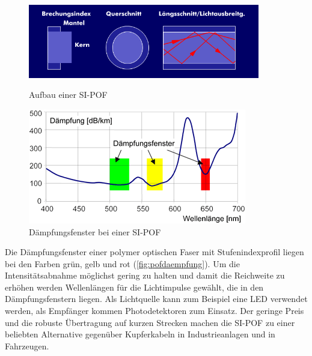 \begin{figure}[h]
    \begin{center}
        \begin{minipage}[t]{0.4\textwidth}
            \begin{center}
                \includegraphics[width=0.9\textwidth]{Bilder/Optische_Wellenleiter_Die_Polymer_Optische_Faser/Brechzahlprofile/pofsi.png}
                \caption[Aufbau einer SI-POF \newline \url{http://www.itwissen.info/bilder/aufbau-und-brechungsprofil-der-stufenindex-profilfaser.png} (zuletzt aufgerufen am 19.09.2015)]{Aufbau einer SI-POF}
                \label{fig:pofsi}
            \end{center}
        \end{minipage}
        \hspace{0.025\textwidth}
        \begin{minipage}[t]{0.4\textwidth}
            \begin{center}
                \includegraphics[height=0.1\textheight]{Bilder/Optische_Wellenleiter_Die_Polymer_Optische_Faser/Funktionsweise/pofdaempfung.png}
                \caption[Dämpfungsfenster bei einer SI-POF \newline \url{http://www.pofac.fh-nuernberg.de/pofac/de/was_sind_pof/images/pmma_daempfung.png} (zuletzt aufgerufen am 19.09.2015)]{Dämpfungsfenster bei einer SI-POF}
                \label{fig:pofdaempfung}
            \end{center}
        \end{minipage}
    \end{center}
\end{figure}

Die Dämpfungsfenster einer polymer optischen Faser mit Stufenindexprofil liegen
bei den Farben grün, gelb und rot (\autoref{fig:pofdaempfung}). Um die
Intensitätsabnahme möglichst gering zu halten und damit die Reichweite zu
erhöhen werden Wellenlängen für die Lichtimpulse gewählt, die in den
Dämpfungsfenstern liegen. Als Lichtquelle kann zum Beispiel eine LED verwendet
werden, als Empfänger kommen Photodetektoren zum Einsatz. Der geringe Preis und
die robuste Übertragung auf kurzen Strecken machen die SI-POF zu einer beliebten
Alternative gegenüber Kupferkabeln in Industrieanlagen und in Fahrzeugen.
\cite{poflee}
